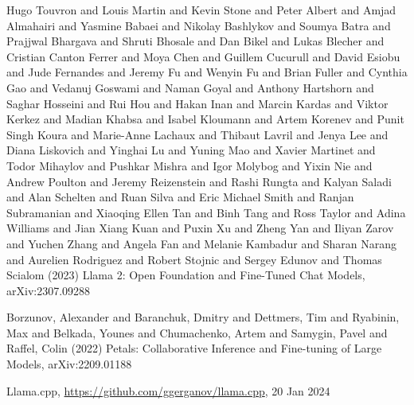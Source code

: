 \documentclass{article}
\begin{document}
\begin{thebibliography}{9}
  Hugo Touvron and Louis Martin and Kevin Stone and Peter Albert and Amjad Almahairi and Yasmine Babaei and Nikolay Bashlykov and Soumya Batra and Prajjwal Bhargava and Shruti Bhosale and Dan Bikel and Lukas Blecher and Cristian Canton Ferrer and Moya Chen and Guillem Cucurull and David Esiobu and Jude Fernandes and Jeremy Fu and Wenyin Fu and Brian Fuller and Cynthia Gao and Vedanuj Goswami and Naman Goyal and Anthony Hartshorn and Saghar Hosseini and Rui Hou and Hakan Inan and Marcin Kardas and Viktor Kerkez and Madian Khabsa and Isabel Kloumann and Artem Korenev and Punit Singh Koura and Marie-Anne Lachaux and Thibaut Lavril and Jenya Lee and Diana Liskovich and Yinghai Lu and Yuning Mao and Xavier Martinet and Todor Mihaylov and Pushkar Mishra and Igor Molybog and Yixin Nie and Andrew Poulton and Jeremy Reizenstein and Rashi Rungta and Kalyan Saladi and Alan Schelten and Ruan Silva and Eric Michael Smith and Ranjan Subramanian and Xiaoqing Ellen Tan and Binh Tang and Ross Taylor and Adina Williams and Jian Xiang Kuan and Puxin Xu and Zheng Yan and Iliyan Zarov and Yuchen Zhang and Angela Fan and Melanie Kambadur and Sharan Narang and Aurelien Rodriguez and Robert Stojnic and Sergey Edunov and Thomas Scialom (2023) Llama 2: Open Foundation and Fine-Tuned Chat Models, arXiv:2307.09288

  Borzunov, Alexander and Baranchuk, Dmitry and Dettmers, Tim and Ryabinin, Max and Belkada, Younes and Chumachenko, Artem and Samygin, Pavel and Raffel, Colin (2022) Petals: Collaborative Inference and Fine-tuning of Large Models, arXiv:2209.01188

  Llama.cpp, \url{https://github.com/ggerganov/llama.cpp}, 20 Jan 2024
\end{thebibliography}
\end{document}
